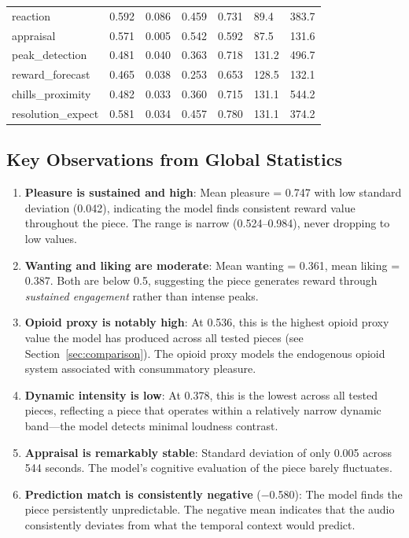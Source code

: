 \documentclass[11pt]{article}
\begin{document}
\begin{table}[H]
\begin{tabular}{l R{1.3cm} R{1.3cm} R{1.3cm} R{1.3cm} R{1.8cm} R{1.8cm}}
reaction & 0.592 & 0.086 & 0.459 & 0.731 & 89.4 & 383.7 \\
appraisal & 0.571 & 0.005 & 0.542 & 0.592 & 87.5 & 131.6 \\
peak\_detection & 0.481 & 0.040 & 0.363 & 0.718 & 131.2 & 496.7 \\
reward\_forecast & 0.465 & 0.038 & 0.253 & 0.653 & 128.5 & 132.1 \\
chills\_proximity & 0.482 & 0.033 & 0.360 & 0.715 & 131.1 & 544.2 \\
resolution\_expect & 0.581 & 0.034 & 0.457 & 0.780 & 131.1 & 374.2 \\
\bottomrule
\end{tabular}
\end{table}

\subsection{Key Observations from Global Statistics}

\begin{enumerate}
    \item \textbf{Pleasure is sustained and high}: Mean pleasure = 0.747 with low standard deviation (0.042), indicating the model finds consistent reward value throughout the piece. The range is narrow (0.524--0.984), never dropping to low values.

    \item \textbf{Wanting and liking are moderate}: Mean wanting = 0.361, mean liking = 0.387. Both are below 0.5, suggesting the piece generates reward through \emph{sustained engagement} rather than intense peaks.

    \item \textbf{Opioid proxy is notably high}: At 0.536, this is the highest opioid proxy value the model has produced across all tested pieces (see Section~\ref{sec:comparison}). The opioid proxy models the endogenous opioid system associated with consummatory pleasure.

    \item \textbf{Dynamic intensity is low}: At 0.378, this is the lowest across all tested pieces, reflecting a piece that operates within a relatively narrow dynamic band---the model detects minimal loudness contrast.

    \item \textbf{Appraisal is remarkably stable}: Standard deviation of only 0.005 across 544 seconds. The model's cognitive evaluation of the piece barely fluctuates.

    \item \textbf{Prediction match is consistently negative} ($-$0.580): The model finds the piece persistently unpredictable. The negative mean indicates that the audio consistently deviates from what the temporal context would predict.
\end{enumerate}
\end{document}
